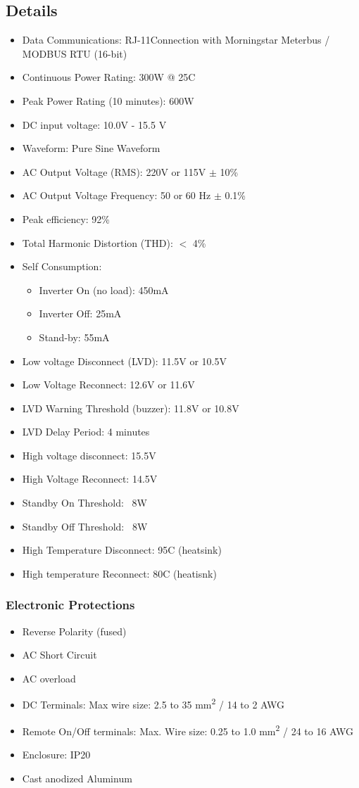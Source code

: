 \subsection{Details}
\begin{itemize}
	\item Data Communications: RJ-11Connection with Morningstar Meterbus / MODBUS RTU (16-bit) 
	\item Continuous Power Rating: 300W @ 25\degree C 
	\item Peak Power Rating (10 minutes): 600W 
	\item DC input voltage: 10.0V  - 15.5 V 
	\item Waveform: Pure Sine Waveform 
	\item AC Output Voltage (RMS): 220V or 115V $\pm$ 10\% 
	\item AC Output Voltage Frequency: 50 or 60 Hz $\pm$ 0.1\% 
	\item Peak efficiency: 92\%
	\item Total Harmonic Distortion (THD): $<$ 4\%
	\item Self Consumption: 
	\begin{itemize}
		\item Inverter On (no load): 450mA
		\item Inverter Off: 25mA
		\item Stand-by: 55mA
	\end{itemize}
	\item Low voltage Disconnect (LVD): 11.5V or 10.5V 
	\item Low Voltage Reconnect: 12.6V or 11.6V
	\item LVD Warning Threshold (buzzer): 11.8V or 10.8V
	\item LVD Delay Period: 4 minutes
	\item High voltage disconnect: 15.5V
	\item High Voltage Reconnect: 14.5V
	\item Standby On Threshold: ~8W
	\item Standby Off Threshold: ~8W
	\item High Temperature Disconnect: 95\degree C  (heatsink)
	\item High temperature Reconnect: 80\degree C (heatisnk)
\end{itemize}
\subsubsection{Electronic Protections}
\begin{itemize}
	\item Reverse Polarity (fused)
	\item AC Short Circuit
	\item AC overload
	\item DC Terminals: Max wire size: 2.5 to 35 mm\textsuperscript{2} / 14 to 2 AWG
	\item Remote On/Off terminals: Max. Wire size: 0.25 to 1.0 mm\textsuperscript{2} / 24 to 16 AWG
	\item Enclosure: IP20
	\item Cast anodized Aluminum
\end{itemize}

